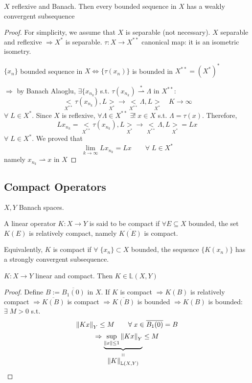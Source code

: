 \begin{theorem}
    \(X\) reflexive and Banach. Then every bounded sequence in \(X\) has a weakly convergent subsequence
\end{theorem}

\begin{proof}
    For simplicity, we assume that \(X\) is separable (not necessary). \(X \) separable and reflexive \(\Rightarrow X^*\) is separable. \(\tau:X \to X^{**}\) canonical map: it is an isometric isometry.

    \(\{x_n\}\) bounded sequence in \(X \iff \{ \tau(x_n) \}\) is bounded in \(X^{**} = (X^*)^*\)
        
    \(\Rightarrow \) by Banach Alaoglu, \(\exists \{x_{n_k}\}\) s.t. \(\tau(x_{n_k}) \overset{*}{\rightharpoonup} \Lambda \) in \(X^{**}\):
    \[
        \underset{X^{**}}{<}\tau(x_{n_k}), L \underset{X^*}{>} \to \underset{X^{**}}{<}\Lambda, L \underset{X^*}{>} \quad K \to \infty
    \]
    \(\forall\; L \in X^*.\) Since \(X\) is reflexive, \(\forall \Lambda \in X^{**} \) \(\exists ! \; x \in X\) s.t. \(\Lambda = \tau (x)\). Therefore, 
    \[
        L x_{n_k} = \underset{X^{**}}{<}\tau(x_{n_k}), L \underset{X^*}{>} \to \underset{X^{**}}{<}\Lambda, L \underset{X^*}{>} = Lx
    \]
    \(\forall\; L \in X^*\). We proved that 
    \[
        \lim_{k \to \infty} L x_{n_k} = Lx \qquad \forall\; L \in X^*
    \]
    namely \(x_{n_k} \rightharpoonup x\) in \(X\)
\end{proof}

\subsection*{Compact Operators}
\(X, Y\) Banach spaces. 
\begin{definition}
    A linear operator \(K:X \to Y\) is said to be compact if \(\forall E \subseteq X\) bounded, the set \(K(E)\) is relatively compact, namely \(\overline{K(E)}\) is compact. 

    Equivalently, \(K\) is compact if \(\forall \; \{x_n\} \subset X \) bounded, the sequence \(\{K(x_n)\}\) has a strongly convergent subsequence. 
\end{definition}
\begin{proposition}
    \(K:X \to Y\) linear and compact. Then \(K \in \mathbb{L}(X, Y)\)
\end{proposition}
\begin{proof}
    Define \(B:=\overline{B_1(0)}\) in \(X\). If \(K\) is compact 
    \(\Rightarrow K(B) \) is relatively compact 
    \(\Rightarrow \overline{K(B)}\) is compact 
    \(\Rightarrow \overline{K(B)}\) is bounded
    \(\Rightarrow K(B)\) is bounded: \(\exists \; M>0 \) s.t. 
    \[
        \norm{Kx}_Y \leq M \qquad \forall \; x \in \overline{B_1(0)} = B
    \]
    \[
        \Rightarrow \stackbelow{\underbrace{\sup_{\norm{x} \leq 1} \norm{Kx}_Y}}{\norm{K}_{\mathbb{L}(X, Y)}} \leq M
    \]
\end{proof}

